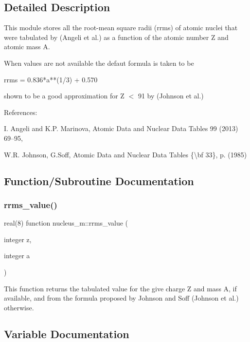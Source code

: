 \subsection{Detailed Description}
This module stores all the root-\/mean square radii (rrms) of atomic nuclei that were tabulated by (Angeli et al.) as a function of the atomic number Z and atomic mass A. 

When values are not available the defaut formula is taken to be \begin{DoxyVerb}    rrms = 0.836*a**(1/3) + 0.570
\end{DoxyVerb}


shown to be a good approximation for Z $<$ 91 by (Johnson et al.)

References\+:

I. Angeli and K.\+P. Marinova, Atomic Data and Nuclear Data Tables 99 (2013) 69–95,

W.\+R. Johnson, G.\+Soff, Atomic Data and Nuclear Data Tables \{\textbackslash{}bf 33\}, p. (1985) 

\subsection{Function/\+Subroutine Documentation}
\mbox{\label{namespacenucleus__m_a83e8714be10756711874d134c66bcf73}} 
\subsubsection{\texorpdfstring{rrms\_value()}{rrms\_value()}}
{\footnotesize\ttfamily real(8) function nucleus\+\_\+m\+::rrms\+\_\+value (\begin{DoxyParamCaption}\item[{integer}]{z,  }\item[{integer}]{a }\end{DoxyParamCaption})}



This function returns the tabulated value for the give charge Z and mass A, if available, and from the formula proposed by Johnson and Soff (Johnson et al.) otherwise. 



\subsection{Variable Documentation}
\mbox{\label{namespacenucleus__m_ac8aa001386cf3938a2be5b5ec45d0c8d}} 
